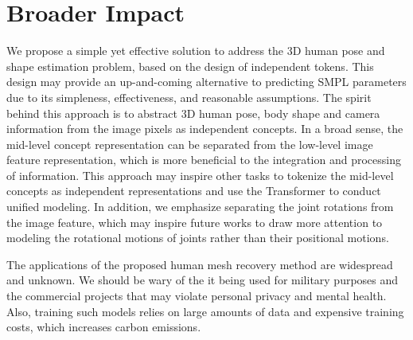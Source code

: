 \documentclass{article}
\begin{document}
\section{Broader Impact}

We propose a simple yet effective solution to address the 3D human pose and shape estimation problem, based on the design of independent tokens. This design may provide an up-and-coming alternative to predicting SMPL parameters due to its simpleness, effectiveness, and reasonable assumptions. The spirit behind this approach is to abstract 3D human pose, body shape and camera information from the image pixels as independent concepts. In a broad sense, the mid-level concept representation can be separated from the low-level image feature representation, which is more beneficial to the integration and processing of information. This approach may inspire other tasks to tokenize the mid-level concepts as independent representations and use the Transformer to conduct unified modeling. 
 In addition, we emphasize separating the joint rotations from the image feature, which may inspire future works to draw more attention to modeling the rotational motions of joints rather than their positional motions.

The applications of the proposed human mesh recovery method are widespread and unknown. We should be wary of the it being used for military purposes and the commercial projects that may violate personal privacy and mental health. Also, training such models relies on large amounts of data and expensive training costs, which increases carbon emissions.


{\small
	
	
}
\end{document}
